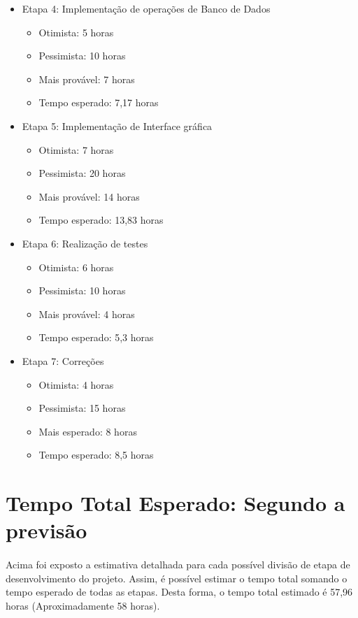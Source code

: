 \documentclass[12pt,a4paper]{article}
\begin{document}
\begin{itemize}
\begin{itemize}
		\end{itemize}
	 \item Etapa 4: Implementação de operações de Banco de Dados
			\begin{itemize}
				\item Otimista: 5 horas
				\item Pessimista: 10 horas
				\item Mais provável: 7 horas
				\item Tempo esperado: 7,17 horas
			\end{itemize}
			\item Etapa 5: Implementação de Interface gráfica
			\begin{itemize}
				\item Otimista: 7 horas
				\item Pessimista: 20 horas
				\item Mais provável: 14 horas
				\item Tempo esperado: 13,83 horas
			\end{itemize}
			\item Etapa 6: Realização de testes
			\begin{itemize}
				\item Otimista: 6 horas
				\item Pessimista: 10 horas
				\item Mais provável: 4 horas
				\item Tempo esperado: 5,3 horas
			\end{itemize}
			\item Etapa 7: Correções
			\begin{itemize}
				\item Otimista: 4 horas
				\item Pessimista: 15 horas
				\item Mais esperado: 8 horas
				\item Tempo esperado: 8,5 horas
			\end{itemize}
	\end{itemize}
	
	\section{Tempo Total Esperado: Segundo a previsão}
	
	\paragraph{} Acima foi exposto a estimativa detalhada para cada possível divisão de etapa de desenvolvimento do projeto. Assim, é possível estimar o tempo total somando o tempo esperado de todas as etapas. Desta forma, o tempo total estimado é 57,96 horas (Aproximadamente 58 horas).
	
\end{document}
